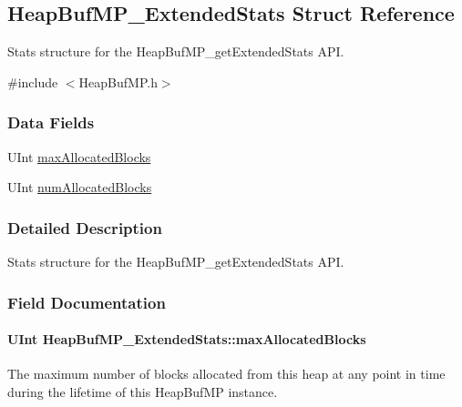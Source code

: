 \subsection{HeapBufMP\_\-ExtendedStats Struct Reference}
\label{struct_heap_buf_m_p___extended_stats}


Stats structure for the HeapBufMP\_\-getExtendedStats API.  




{\ttfamily \#include $<$HeapBufMP.h$>$}

\subsubsection*{Data Fields}
\begin{DoxyCompactItemize}
\item 
UInt \hyperlink{struct_heap_buf_m_p___extended_stats_a94d85b9a5a7632bfa0d0962917055df1}{maxAllocatedBlocks}
\item 
UInt \hyperlink{struct_heap_buf_m_p___extended_stats_a757dc392845103b1e5b31ab02d17bef5}{numAllocatedBlocks}
\end{DoxyCompactItemize}


\subsubsection{Detailed Description}
Stats structure for the HeapBufMP\_\-getExtendedStats API. 

\subsubsection{Field Documentation}
\paragraph[{maxAllocatedBlocks}]{\setlength{\rightskip}{0pt plus 5cm}UInt {\bf HeapBufMP\_\-ExtendedStats::maxAllocatedBlocks}}\hfill\label{struct_heap_buf_m_p___extended_stats_a94d85b9a5a7632bfa0d0962917055df1}
The maximum number of blocks allocated from this heap at any point in time during the lifetime of this HeapBufMP instance. 
